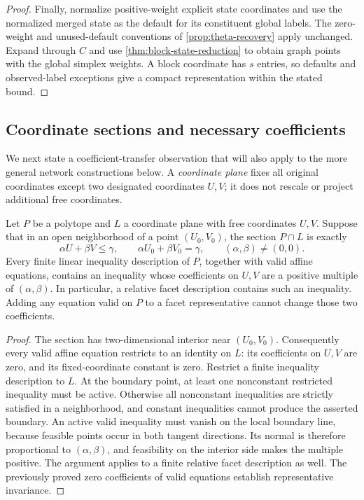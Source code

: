 \begin{proof}
Finally, normalize positive-weight explicit state coordinates and use
the normalized merged state as the default for its constituent global
labels. The zero-weight and unused-default conventions of
\cref{prop:theta-recovery} apply unchanged. Expand through $C$ and
use \cref{thm:block-state-reduction} to obtain graph points with the
global simplex weights. A block coordinate has $s$ entries, so defaults
and observed-label exceptions give a compact representation within the
stated bound.
\end{proof}

\subsection{Coordinate sections and necessary coefficients}\label{subsec:section-facets}
We next state a coefficient-transfer observation that will also apply to
the more general network constructions below. A \emph{coordinate plane}
fixes all original coordinates except two designated coordinates $U,V$;
it does not rescale or project additional free coordinates.

\begin{lemma}\label{lem:section-facet}
Let $P$ be a polytope and $L$ a coordinate plane with free coordinates
$U,V$. Suppose that in an open neighborhood of a point $(U_0,V_0)$,
the section $P\cap L$ is exactly
\begin{equation}\label{eq:local-halfplane}
                 \alpha U+\beta V\le\gamma,
 \qquad \alpha U_0+\beta V_0=\gamma,\qquad
                 (\alpha,\beta)\ne(0,0).
\end{equation}
Every finite linear inequality description of $P$, together with valid
affine equations, contains an inequality whose coefficients on $U,V$
are a positive multiple of $(\alpha,\beta)$. In particular, a relative
facet description contains such an inequality. Adding any equation
valid on $P$ to a facet representative cannot change those two coefficients.
\end{lemma}
\begin{proof}
The section has two-dimensional interior near $(U_0,V_0)$. Consequently
every valid affine equation restricts to an identity on $L$: its
coefficients on $U,V$ are zero, and its fixed-coordinate constant is
zero. Restrict a finite inequality description to $L$. At the boundary
point, at least one nonconstant restricted inequality must be active.
Otherwise all nonconstant inequalities are strictly satisfied in a
neighborhood, and constant inequalities cannot produce the asserted
boundary. An active valid inequality must vanish on the local boundary
line, because feasible points occur in both tangent directions. Its
normal is therefore proportional to $(\alpha,\beta)$, and feasibility
on the interior side makes the multiple positive. The argument applies
to a finite relative facet description as well. The previously proved
zero coefficients of valid equations establish representative invariance.
\end{proof}

